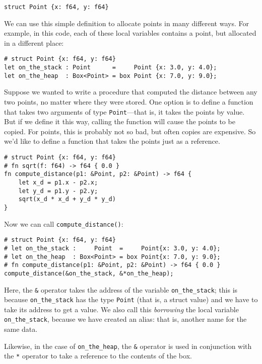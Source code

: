 \documentclass[]{article}
\begin{document}
\begin{verbatim}
struct Point {x: f64, y: f64}
\end{verbatim}

We can use this simple definition to allocate points in many different
ways. For example, in this code, each of these local variables contains
a point, but allocated in a different place:

\begin{verbatim}
# struct Point {x: f64, y: f64}
let on_the_stack : Point      =     Point {x: 3.0, y: 4.0};
let on_the_heap  : Box<Point> = box Point {x: 7.0, y: 9.0};
\end{verbatim}

Suppose we wanted to write a procedure that computed the distance
between any two points, no matter where they were stored. One option is
to define a function that takes two arguments of type
\texttt{Point}---that is, it takes the points by value. But if we define
it this way, calling the function will cause the points to be copied.
For points, this is probably not so bad, but often copies are expensive.
So we'd like to define a function that takes the points just as a
reference.

\begin{verbatim}
# struct Point {x: f64, y: f64}
# fn sqrt(f: f64) -> f64 { 0.0 }
fn compute_distance(p1: &Point, p2: &Point) -> f64 {
    let x_d = p1.x - p2.x;
    let y_d = p1.y - p2.y;
    sqrt(x_d * x_d + y_d * y_d)
}
\end{verbatim}

Now we can call \texttt{compute\_distance()}:

\begin{verbatim}
# struct Point {x: f64, y: f64}
# let on_the_stack :     Point  =     Point{x: 3.0, y: 4.0};
# let on_the_heap  : Box<Point> = box Point{x: 7.0, y: 9.0};
# fn compute_distance(p1: &Point, p2: &Point) -> f64 { 0.0 }
compute_distance(&on_the_stack, &*on_the_heap);
\end{verbatim}

Here, the \texttt{\&} operator takes the address of the variable
\texttt{on\_the\_stack}; this is because \texttt{on\_the\_stack} has the
type \texttt{Point} (that is, a struct value) and we have to take its
address to get a value. We also call this \emph{borrowing} the local
variable \texttt{on\_the\_stack}, because we have created an alias: that
is, another name for the same data.

Likewise, in the case of \texttt{on\_the\_heap}, the \texttt{\&}
operator is used in conjunction with the \texttt{*} operator to take a
reference to the contents of the box.
\end{document}
